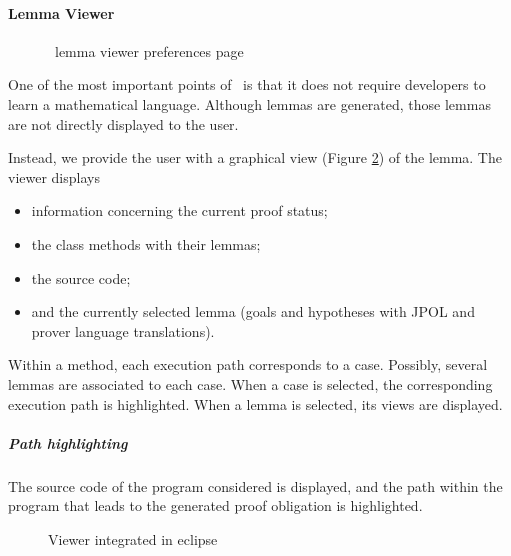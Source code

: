 \paragraph{Lemma Viewer}
\begin{figure}[p]
 \caption{\sc \JACK\ lemma viewer preferences page}
 \label{JACKlemviewprefpage}
\end{figure}
\label{Viewer}
One of the most important points of \JACK\ is that it does not require
developers to learn a mathematical language.  Although lemmas are
generated, those lemmas are not directly displayed to the user.

Instead, we provide the user with a graphical view (Figure \ref{Viewer image}) of the lemma.
 The viewer displays
 \begin{itemize}
  \item information concerning the current proof status;
  \item the class methods with their lemmas;
  \item the source code;
  \item and the currently selected lemma (goals and hypotheses with JPOL and prover language translations).
\end{itemize}
 Within a method, each execution path corresponds to a case.
 Possibly, several lemmas are associated to each case.
 When a case is selected, the corresponding execution path is highlighted.
 When a lemma is selected, its views are displayed.
\subparagraph{Path highlighting}
The source code of the program considered is displayed, and the
path within the program that leads to the generated proof obligation
is highlighted.

\begin{figure}[p]
 \caption{\sc Viewer integrated in eclipse}
 \label{Viewer image}
\end{figure}

